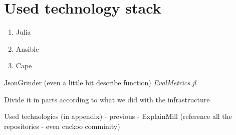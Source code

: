 \chapter{Used technology stack} \label{app:technologies}
\begin{enumerate}
    \item Julia
    \item Ansible
    \item Cape
\end{enumerate}


JsonGrinder (even a little bit describe function)
\emph{EvalMetrics.jl}

Divide it in parts according to what we did with the infrastructure




Used technologies (in appendix)
  - previous
  - ExplainMill
  (reference all the repositories - even cuckoo comminity)